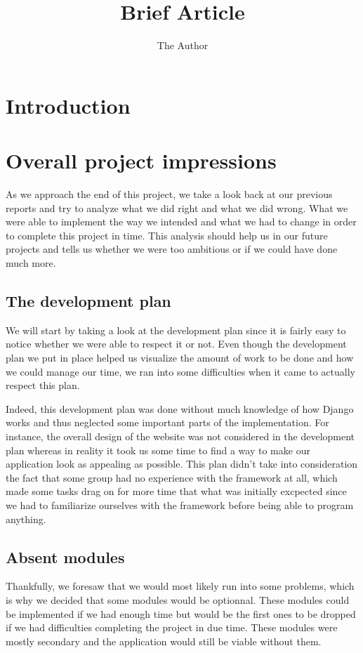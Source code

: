 \documentclass[11pt, a4paper]{article}      %
\title{Brief Article}
\author{The Author}
\begin{document}

\section{Introduction}

\section{Overall project impressions}

As we approach the end of this project, we take a look back at our previous reports and try to analyze what we did right and what we did wrong. What we were able to implement the way we intended and what we had to change in order to complete this project in time. This analysis should help us in our future projects and tells us whether we were too ambitious or if we could have done much more.

\subsection{The development plan}

We will start by taking a look at the development plan since it is fairly easy to notice whether we were able to respect it or not. Even though the development plan we put in place helped us visualize the amount of work to be done and how we could manage our time, we ran into some difficulties when it came to actually respect this plan.

Indeed, this development plan was done without much knowledge of how Django works and thus neglected some important parts of the implementation. For instance, the overall design of the website was not considered in the development plan whereas in reality it took us some time to find a way to make our application look as appealing as possible. 
This plan didn't take into consideration the fact that some group had no experience with the framework at all, which made some tasks drag on for more time that what was initially excpected since we had to familiarize ourselves with the framework before being able to program anything. 

\subsection{Absent modules}
Thankfully, we foresaw that we would most likely run into some problems, which is why we decided that some modules would be optionnal. These modules could be implemented if we had enough time but would be the first ones to be dropped if we had difficulties completing the project in due time. These modules were mostly secondary and the application would still be viable without them.
\end{document}

